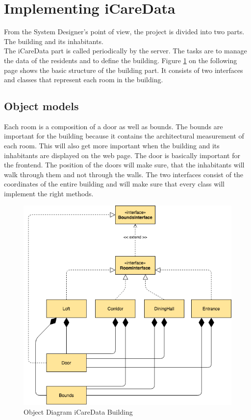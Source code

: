 \section{Implementing iCareData}
\label{chap:iCareData}
From the System Designer's point of view, the project is divided into two parts. The building and its inhabitants. 
\\
The iCareData part is called periodically by the server. The tasks are to manage the data of the residents and to define the building. Figure \ref{fig:iCareDataBuilding} on the following page shows the basic structure of the building part. It consists of two interfaces and classes that represent each room in the building. 
\subsection{Object models}
Each room is a composition of a door as well as bounds. The bounds are important for the building because it contains the architectural measurement of each room. This will also get more important when the building and its inhabitants are displayed on the web page. The door is basically important for the frontend. The position of the doors will make sure, that the inhabitants will walk through them and not through the walls. The two interfaces consist of the coordinates of the entire building and will make sure that every class will implement the right methods.
\begin{figure}[h]
	\centering
	\includegraphics[width=\textwidth]{images/iCareDataBuilding}
	\caption{Object Diagram iCareData Building}
	\label{fig:iCareDataBuilding}
\end{figure}
